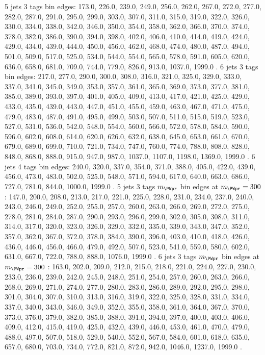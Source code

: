 5 jets 3 \PQb tags \HT bin edges:
173.0, 226.0, 239.0, 249.0, 256.0, 262.0, 267.0, 272.0, 277.0, 282.0, 287.0, 291.0, 295.0, 299.0, 303.0, 307.0, 311.0, 315.0, 319.0, 322.0, 326.0, 330.0, 334.0, 338.0, 342.0, 346.0, 350.0, 354.0, 358.0, 362.0, 366.0, 370.0, 374.0, 378.0, 382.0, 386.0, 390.0, 394.0, 398.0, 402.0, 406.0, 410.0, 414.0, 419.0, 424.0, 429.0, 434.0, 439.0, 444.0, 450.0, 456.0, 462.0, 468.0, 474.0, 480.0, 487.0, 494.0, 501.0, 509.0, 517.0, 525.0, 534.0, 544.0, 554.0, 565.0, 578.0, 591.0, 605.0, 620.0, 636.0, 658.0, 681.0, 709.0, 744.0, 779.0, 826.0, 913.0, 1037.0, 1999.0 .
6 jets 3 \PQb tags \HT bin edges:
217.0, 277.0, 290.0, 300.0, 308.0, 316.0, 321.0, 325.0, 329.0, 333.0, 337.0, 341.0, 345.0, 349.0, 353.0, 357.0, 361.0, 365.0, 369.0, 373.0, 377.0, 381.0, 385.0, 389.0, 393.0, 397.0, 401.0, 405.0, 409.0, 413.0, 417.0, 421.0, 425.0, 429.0, 433.0, 435.0, 439.0, 443.0, 447.0, 451.0, 455.0, 459.0, 463.0, 467.0, 471.0, 475.0, 479.0, 483.0, 487.0, 491.0, 495.0, 499.0, 503.0, 507.0, 511.0, 515.0, 519.0, 523.0, 527.0, 531.0, 536.0, 542.0, 548.0, 554.0, 560.0, 566.0, 572.0, 578.0, 584.0, 590.0, 596.0, 602.0, 608.0, 614.0, 620.0, 626.0, 632.0, 638.0, 645.0, 653.0, 661.0, 670.0, 679.0, 689.0, 699.0, 710.0, 721.0, 734.0, 747.0, 760.0, 774.0, 788.0, 808.0, 828.0, 848.0, 868.0, 888.0, 915.0, 947.0, 987.0, 1037.0, 1107.0, 1198.0, 1369.0, 1999.0 .
6 jets 4 \PQb tags \HT bin edges:
240.0, 320.0, 337.0, 354.0, 371.0, 388.0, 405.0, 422.0, 439.0, 456.0, 473.0, 483.0, 502.0, 525.0, 548.0, 571.0, 594.0, 617.0, 640.0, 663.0, 686.0, 727.0, 781.0, 844.0, 1000.0, 1999.0 .
5 jets 3 \Pqb tags $m_{\PWpr}$ bin edges at $m_{\PWpr}=300$ \GeV:
147.0, 200.0, 208.0, 213.0, 217.0, 221.0, 225.0, 228.0, 231.0, 234.0, 237.0, 240.0, 243.0, 246.0, 249.0, 252.0, 255.0, 257.0, 260.0, 263.0, 266.0, 269.0, 272.0, 275.0, 278.0, 281.0, 284.0, 287.0, 290.0, 293.0, 296.0, 299.0, 302.0, 305.0, 308.0, 311.0, 314.0, 317.0, 320.0, 323.0, 326.0, 329.0, 332.0, 335.0, 339.0, 343.0, 347.0, 352.0, 357.0, 362.0, 367.0, 372.0, 378.0, 384.0, 390.0, 396.0, 403.0, 410.0, 418.0, 426.0, 436.0, 446.0, 456.0, 466.0, 479.0, 492.0, 507.0, 523.0, 541.0, 559.0, 580.0, 602.0, 631.0, 667.0, 722.0, 788.0, 888.0, 1076.0, 1999.0 .
6 jets 3 \Pqb tags $m_{\PWpr}$ bin edges at $m_{\PWpr}=300$ \GeV:
163.0, 202.0, 209.0, 212.0, 215.0, 218.0, 221.0, 224.0, 227.0, 230.0, 233.0, 236.0, 239.0, 242.0, 245.0, 248.0, 251.0, 254.0, 257.0, 260.0, 263.0, 266.0, 268.0, 269.0, 271.0, 274.0, 277.0, 280.0, 283.0, 286.0, 289.0, 292.0, 295.0, 298.0, 301.0, 304.0, 307.0, 310.0, 313.0, 316.0, 319.0, 322.0, 325.0, 328.0, 331.0, 334.0, 337.0, 340.0, 343.0, 346.0, 349.0, 352.0, 355.0, 358.0, 361.0, 364.0, 367.0, 370.0, 373.0, 376.0, 379.0, 382.0, 385.0, 388.0, 391.0, 394.0, 397.0, 400.0, 403.0, 406.0, 409.0, 412.0, 415.0, 419.0, 425.0, 432.0, 439.0, 446.0, 453.0, 461.0, 470.0, 479.0, 488.0, 497.0, 507.0, 518.0, 529.0, 540.0, 552.0, 567.0, 584.0, 601.0, 618.0, 635.0, 657.0, 680.0, 703.0, 734.0, 772.0, 821.0, 872.0, 942.0, 1046.0, 1237.0, 1999.0 .
